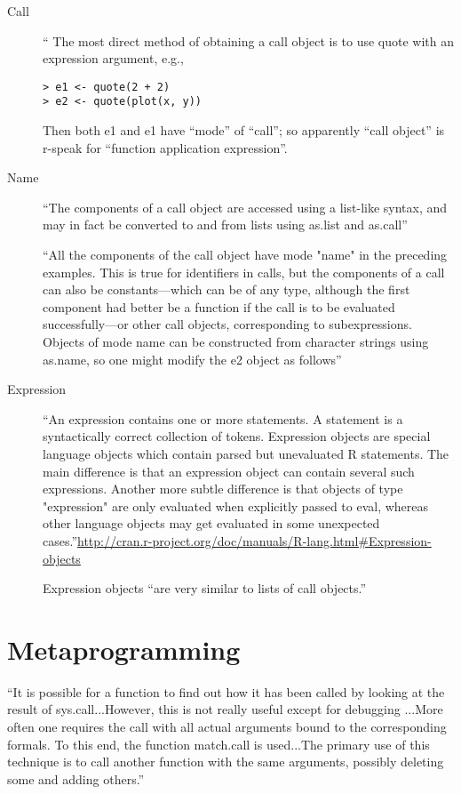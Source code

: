 \begin{description}
\item [Call] `` The most direct method of obtaining a call object is to use quote with an expression argument, e.g.,

\begin{verbatim}
> e1 <- quote(2 + 2)
> e2 <- quote(plot(x, y))
\end{verbatim}

Then both e1 and e1 have ``mode'' of ``call''; so apparently ``call
object'' is r-speak for ``function application expression''.

\item [Name]  ``The components of a call object are accessed using a list-like syntax, and may in fact be converted to and from lists using as.list and as.call''

``All the components of the call object have mode "name" in the preceding examples. This is true for identifiers in calls, but the components of a call can also be constants—which can be of any type, although the first component had better be a function if the call is to be evaluated successfully—or other call objects, corresponding to subexpressions. Objects of mode name can be constructed from character strings using as.name, so one might modify the e2 object as follows''

\item [Expression]  ``An expression contains one or more statements. A statement is a syntactically correct collection of tokens. Expression objects are special language objects which contain parsed but unevaluated R statements. The main difference is that an expression object can contain several such expressions. Another more subtle difference is that objects of type "expression" are only evaluated when explicitly passed to eval, whereas other language objects may get evaluated in some unexpected cases.''\url{http://cran.r-project.org/doc/manuals/R-lang.html#Expression-objects}

Expression objects ``are very similar to lists of call objects.''

\end{description}


\section{Metaprogramming}
\label{sect:rmetapgm}


``It is possible for a function to find out how it has been called by looking at the result of sys.call...However, this is not really useful except for debugging ...More often one requires the call with all actual arguments bound to the corresponding formals. To this end, the function match.call is used...The primary use of this technique is to call another function with the same arguments, possibly deleting some and adding others.''


